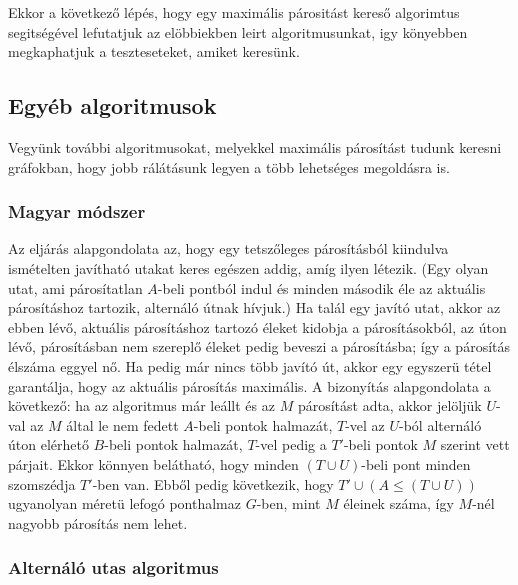 \documentclass[12pt]{article}
\begin{document}
Ekkor a következő lépés, hogy egy maximális párositást kereső algorimtus segitségével lefutatjuk az elöbbiekben leirt algoritmusunkat, igy könyebben megkaphatjuk a teszteseteket, amiket keresünk.
\pagebreak

\subsection{Egyéb algoritmusok}

Vegyünk további algoritmusokat, melyekkel maximális párosítást tudunk keresni gráfokban, hogy jobb rálátásunk legyen a több lehetséges megoldásra is.

\subsubsection{Magyar módszer}

Az eljárás alapgondolata az, hogy egy tetszőleges párosításból kiindulva ismételten javítható utakat keres egészen addig, amíg ilyen létezik. (Egy olyan utat, ami párosítatlan $A$-beli pontból indul és minden második éle az aktuális párosításhoz tartozik, alternáló útnak hívjuk.) Ha talál egy javító utat, akkor az ebben lévő, aktuális párosításhoz tartozó éleket kidobja a párosításokból, az úton lévő, párosításban nem szereplő éleket pedig beveszi a párosításba; így a párosítás élszáma eggyel
nő. Ha pedig már nincs több javító út, akkor egy egyszerü tétel garantálja, hogy az
aktuális párosítás maximális. A bizonyítás alapgondolata a következő: ha az algoritmus már leállt és az $M$ párosítást adta, akkor jelöljük $U$-val az $M$ által le nem
fedett $A$-beli pontok halmazát, $T$-vel az $U$-ból alternáló úton elérhető $B$-beli pontok halmazát, $T$-vel pedig a $T'$-beli pontok $M$ szerint vett párjait. Ekkor könnyen belátható, hogy minden $(T \cup U)$-beli pont minden szomszédja $T'$-ben van. Ebből pedig következik, hogy $T' \cup (A \leq (T \cup U))$ ugyanolyan méretü lefogó ponthalmaz $G$-ben, mint $M$ éleinek száma, így $M$-nél nagyobb párosítás nem lehet. ~\cite{frank2002magyar}\\ 


\subsubsection{Alternáló utas algoritmus}
\end{document}
